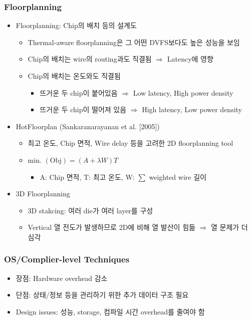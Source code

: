 \subsubsection*{Floorplanning}
\begin{itemize}
    \item Floorplanning: Chip의 배치 등의 설계도
    \begin{itemize}
        \item Thermal-aware floorplanning은 그 어떤 DVFS보다도 높은 성능을 보임
        \item Chip의 배치는 wire의 routing과도 직결됨 $\Rightarrow$ Latency에 영향
        \item Chip의 배치는 온도와도 직결됨
        \begin{itemize}
            \item 뜨거운 두 chip이 붙어있음 $\Rightarrow$ Low latency, High power density
            \item 뜨거운 두 chip이 떨어져 있음 $\Rightarrow$ High latency, Low power density
        \end{itemize}
    \end{itemize}
    \item HotFloorplan (Sankaranarayanan et al. [2005])
    \begin{itemize}
        \item 최고 온도, Chip 면적, Wire delay 등을 고려한 2D floorplanning tool
        \item min. $(\mathrm{Obj}) = (A + \lambda W)T$
        \begin{itemize}
            \item A: Chip 면적, T: 최고 온도, W: $\sum$ weighted wire 길이
        \end{itemize}
    \end{itemize}
    \item 3D Floorplanning
    \begin{itemize}
        \item 3D stakcing: 여러 die가 여러 layer를 구성
        \item Vertical 열 전도가 발생하므로 2D에 비해 열 발산이 힘듦 $\Rightarrow$ 열 문제가 더 심각
    \end{itemize}
\end{itemize}

\subsubsection*{OS/Complier-level Techniques}
\begin{itemize}
    \item 장점: Hardware overhead 감소
    \item 단점: 상태/정보 등을 관리하기 위한 추가 데이터 구조 필요
    \item Design issues: 성능, storage, 컴파일 시간 overhead를 줄여야 함
\end{itemize}
\newpage

